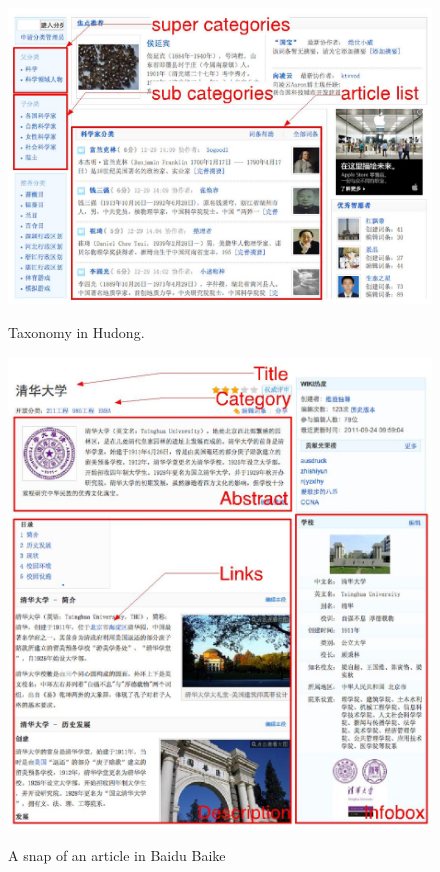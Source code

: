 \documentclass[runningheads,a4paper]{llncs}
\begin{document}
\begin{figure}
    \centering
    \begin{minipage}[t]{0.5\textwidth}
        \centerline{\includegraphics[width=0.8\columnwidth]{fig/hudong-taxonomy}}
        \label{fig:hudong-taxonomy}
        \caption{Taxonomy in Hudong.}
    \end{minipage}%
    \begin{minipage}[t]{0.5\textwidth}
        \centerline{\includegraphics[width=0.8\columnwidth]{fig/baidu-article}}
        \label{fig:baidu-article}
        \caption{A snap of an article in Baidu Baike}
    \end{minipage}%
\end{figure}
\end{document}
